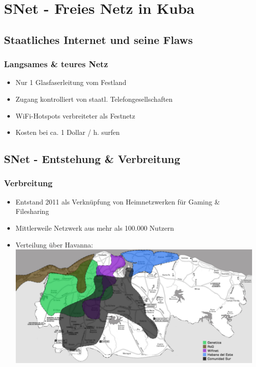 \section{SNet - Freies Netz in Kuba}
\subsection{Staatliches Internet und seine Flaws}

\begin{frame}
\frametitle{Langsames \& teures Netz}
	\begin{itemize}
		\item Nur 1 Glasfaserleitung vom Festland
		\item Zugang kontrolliert von staatl. Telefongesellschaften
		\item WiFi-Hotspots verbreiteter als Festnetz
		\item Kosten bei ca. 1 Dollar / h. surfen
	\end{itemize}
\end{frame}



\subsection{SNet - Entstehung \& Verbreitung}

\begin{frame}
\frametitle{Verbreitung}
	\begin{itemize}
		\item Entstand 2011 als Verknüpfung von Heimnetzwerken für Gaming \& Filesharing
		\item Mittlerweile Netzwerk aus mehr als 100.000 Nutzern
		\item Verteilung über Havanna:
			\includegraphics[width=\textwidth]{images/havanna_net.jpg}
	\end{itemize}
	
\end{frame}

